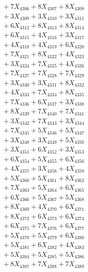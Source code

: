 \documentclass[a4paper,10pt]{article}
\begin{document}
{\begin{align}
&\;  + 7 X_{4306} + 8 X_{4307} + 8 X_{4308} \\[0.3ex]
&\;  + 3 X_{4309} + 3 X_{4310} + 3 X_{4311} \\[0.3ex]
&\;  + 6 X_{4312} + 8 X_{4313} + 8 X_{4314} \\[0.3ex]
&\;  + 6 X_{4315} + 4 X_{4316} + 3 X_{4317} \\[0.3ex]
&\;  + 4 X_{4318} + 4 X_{4319} + 6 X_{4320} \\[0.3ex]
&\;  + 7 X_{4321} + 8 X_{4322} + 4 X_{4323} \\[0.3ex]
&\;  + 3 X_{4324} + 7 X_{4325} + 4 X_{4326} \\[0.3ex]
&\;  + 7 X_{4327} + 7 X_{4328} + 7 X_{4329} \\[0.5ex]\allowbreak
&\;  + 3 X_{4330} + 3 X_{4331} + 8 X_{4332} \\[0.3ex]
&\;  + 4 X_{4333} + 7 X_{4334} + 8 X_{4335} \\[0.3ex]
&\;  + 7 X_{4336} + 6 X_{4337} + 3 X_{4338} \\[0.3ex]
&\;  + 8 X_{4339} + 7 X_{4340} + 7 X_{4341} \\[0.3ex]
&\;  + 3 X_{4342} + 7 X_{4343} + 3 X_{4344} \\[0.3ex]
&\;  + 7 X_{4345} + 5 X_{4346} + 5 X_{4347} \\[0.3ex]
&\;  + 3 X_{4348} + 3 X_{4349} + 5 X_{4350} \\[0.3ex]
&\;  + 3 X_{4351} + 6 X_{4352} + 3 X_{4353} \\[0.3ex]
&\;  + 6 X_{4354} + 5 X_{4355} + 6 X_{4356} \\[0.3ex]
&\;  + 4 X_{4357} + 3 X_{4358} + 4 X_{4359} \\[0.5ex]\allowbreak
&\;  + 5 X_{4360} + 5 X_{4361} + 8 X_{4362} \\[0.3ex]
&\;  + 7 X_{4363} + 5 X_{4364} + 6 X_{4365} \\[0.3ex]
&\;  + 6 X_{4366} + 5 X_{4367} + 5 X_{4368} \\[0.3ex]
&\;  + 8 X_{4369} + 4 X_{4370} + 6 X_{4371} \\[0.3ex]
&\;  + 8 X_{4372} + 6 X_{4373} + 6 X_{4374} \\[0.3ex]
&\;  + 6 X_{4375} + 7 X_{4376} + 6 X_{4377} \\[0.3ex]
&\;  + 5 X_{4378} + 5 X_{4379} + 6 X_{4380} \\[0.3ex]
&\;  + 5 X_{4381} + 6 X_{4382} + 4 X_{4383} \\[0.3ex]
&\;  + 5 X_{4384} + 5 X_{4385} + 5 X_{4386} \\[0.3ex]
&\;  + 8 X_{4387} + 7 X_{4388} + 7 X_{4389} \\[0.5ex]\allowbreak

\end{align}}
\end{document}
